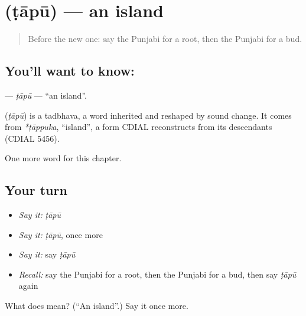 \section[\texorpdfstring{\pa{ਟਾਪੂ} (ṭāpū)}{ਟਾਪੂ (ṭāpū)}]{ (ṭāpū) — an island}

\label{lesson:PA-C126-tapu}



\begin{quote}
Before the new one: say the Punjabi for a root, then the Punjabi for a bud.
\end{quote}

\subsection*{You'll want to know: }
\textbf{} — \emph{ṭāpū} — \textquotedblleft{}an island\textquotedblright{}.

\begin{cousinweb}
\textbf{} (\emph{ṭāpū}) is a tadbhava, a word inherited and reshaped by sound change. It comes from \emph{*ṭāppuka}, \textquotedblleft{}island\textquotedblright{}, a form CDIAL reconstructs from its descendants (CDIAL 5456).
\end{cousinweb}

\begin{grammarlens}[title={What you've built}]
One more word for this chapter.
\end{grammarlens}

\subsection*{Your turn}
\begin{itemize}
\raggedright
  \item \emph{Say it:} \emph{ṭāpū}
  \item \emph{Say it:} \emph{ṭāpū}, once more
  \item \emph{Say it:} say \emph{ṭāpū}
  \item \emph{Recall:} say the Punjabi for a root, then the Punjabi for a bud, then say \emph{ṭāpū} again
\end{itemize}

\begin{tcolorbox}[breakable,colback=teal!4,colframe=teal!35!black,title={Before you move on}]
What does  mean? (\textquotedblleft{}An island\textquotedblright{}.) Say it once more.
\end{tcolorbox}

